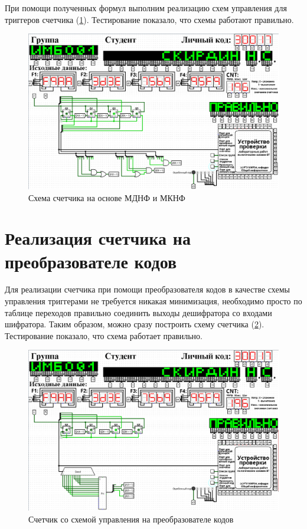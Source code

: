 \documentclass[14pt, a4paper]{extreport}
\begin{document}
При помощи полученных формул выполним реализацию схем управления для триггеров счетчика (\cref{fig:mdnf-mknf}). Тестирование показало, что схемы работают правильно.

\begin{figure}[H]
	\caption{Схема счетчика на основе МДНФ и МКНФ}
	\label{fig:mdnf-mknf}
	\includegraphics[width=\textwidth]{mdnf-mknf}
\end{figure}

\section{Реализация счетчика на преобразователе кодов}
Для реализации счетчика при помощи преобразователя кодов в качестве схемы управления триггерами не требуется никакая минимизация, необходимо просто по таблице переходов правильно соединить выходы дешифратора со входами шифратора. Таким образом, можно сразу построить схему счетчика (\cref{fig:coder}). Тестирование показало, что схема работает правильно.

\begin{figure}[H]
	\caption{Счетчик со схемой управления на преобразователе кодов}
	\label{fig:coder}
	\includegraphics[width=\textwidth]{coder}
\end{figure}
\end{document}
